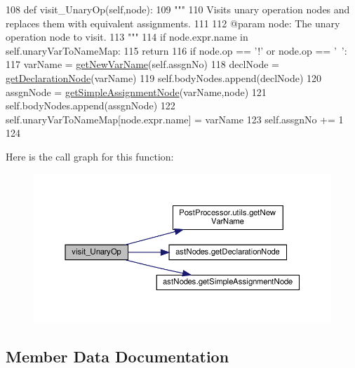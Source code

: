 \begin{DoxyCode}
108     \textcolor{keyword}{def }visit\_UnaryOp(self,node):
109         \textcolor{stringliteral}{"""
}
110 \textcolor{stringliteral}{        Visits unary operation nodes and replaces them with equivalent assignments.
}
111 \textcolor{stringliteral}{
}
112 \textcolor{stringliteral}{        @param node: The unary operation node to visit.
}
113 \textcolor{stringliteral}{        """}
114         \textcolor{keywordflow}{if} node.expr.name \textcolor{keywordflow}{in} self.unaryVarToNameMap:
115             \textcolor{keywordflow}{return}
116         \textcolor{keywordflow}{if} node.op == \textcolor{stringliteral}{'!'} \textcolor{keywordflow}{or} node.op == \textcolor{stringliteral}{'~'}:
117             varName = \hyperlink{namespacePostProcessor_1_1utils_a69c4094b747eccefbd43b8011b1c3626}{getNewVarName}(self.assgnNo)
118             declNode = \hyperlink{namespaceastNodes_ae5e5c7f09a1586002b20db6d72f6d30b}{getDeclarationNode}(varName)
119             self.bodyNodes.append(declNode)
120             assgnNode = \hyperlink{namespaceastNodes_a2403f5d006e54f20e614226280cb6cbc}{getSimpleAssignmentNode}(varName,node)
121             self.bodyNodes.append(assgnNode)
122             self.unaryVarToNameMap[node.expr.name] = varName
123             self.assgnNo += 1
124 
\end{DoxyCode}
Here is the call graph for this function\+:\nopagebreak
\begin{figure}[H]
\begin{center}
\leavevmode
\includegraphics[width=350pt]{classPostProcessor_1_1Visitor_1_1NegationVisitor_ad32412c74dc29affe693267c23ea968a_cgraph}
\end{center}
\end{figure}


\subsection{Member Data Documentation}
\mbox{\label{classPostProcessor_1_1Visitor_1_1NegationVisitor_a8e21c5a928a9743b32315c26ab87b613}} 
